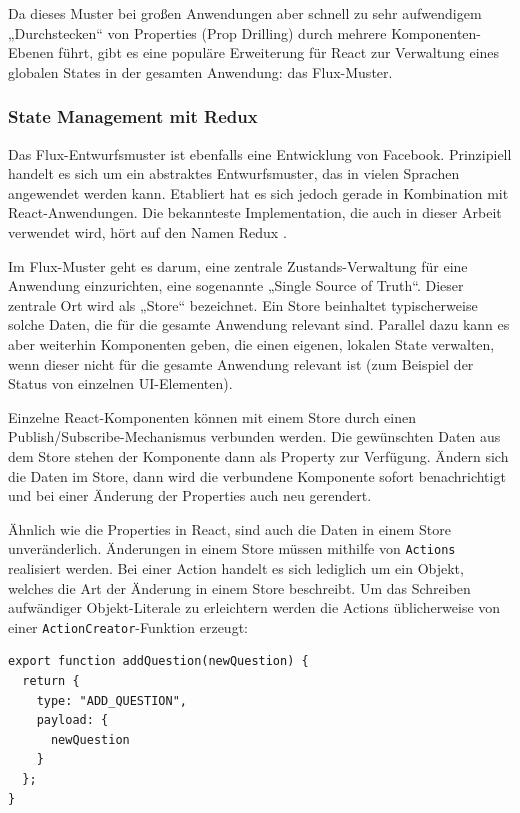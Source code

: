Da dieses Muster bei großen Anwendungen aber schnell zu sehr aufwendigem „Durchstecken“ von Properties (Prop Drilling) durch mehrere Komponenten-Ebenen führt, gibt es eine populäre Erweiterung für React zur Verwaltung eines globalen States in der gesamten Anwendung: das Flux-Muster.


\subsubsection{State Management mit Redux}
Das Flux-Entwurfsmuster ist ebenfalls eine Entwicklung von Facebook. Prinzipiell handelt es sich um ein abstraktes Entwurfsmuster, das in vielen Sprachen angewendet werden kann. Etabliert hat es sich jedoch gerade in Kombination mit React-Anwendungen. Die bekannteste Implementation, die auch in dieser Arbeit verwendet wird, hört auf den Namen Redux \cite{web:redux}.

Im Flux-Muster geht es darum, eine zentrale Zustands-Verwaltung für eine Anwendung einzurichten, eine sogenannte „Single Source of Truth“. Dieser zentrale Ort wird als „Store“ bezeichnet. Ein Store beinhaltet typischerweise solche Daten, die für die gesamte Anwendung relevant sind. Parallel dazu kann es aber weiterhin Komponenten geben, die einen eigenen, lokalen State verwalten, wenn dieser nicht für die gesamte Anwendung relevant ist (zum Beispiel der Status von einzelnen UI-Elementen).

Einzelne React-Komponenten können mit einem Store durch einen Publish/Subscribe-Mechanismus verbunden werden. Die gewünschten Daten aus dem Store stehen der Komponente dann als Property zur Verfügung. Ändern sich die Daten im Store, dann wird die verbundene Komponente sofort benachrichtigt und bei einer Änderung der Properties auch neu gerendert.

Ähnlich wie die Properties in React, sind auch die Daten in einem Store unveränderlich. Änderungen in einem Store müssen mithilfe von \texttt{Actions} realisiert werden. Bei einer Action handelt es sich lediglich um ein Objekt, welches die Art der Änderung in einem Store beschreibt. Um das Schreiben aufwändiger Objekt-Literale zu erleichtern werden die Actions üblicherweise von einer \texttt{ActionCreator}-Funktion erzeugt:

\begin{lstlisting}
export function addQuestion(newQuestion) {
  return {
    type: "ADD_QUESTION",
    payload: {
      newQuestion
    }
  };
}
\end{lstlisting}

